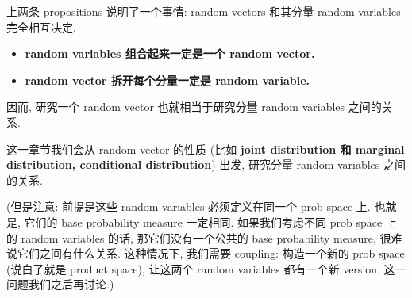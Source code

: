 \begin{remark}
上两条 propositions 说明了一个事情: random vectors 和其分量 random variables 完全相互决定.
\begin{itemize}
    \item\textbf{ random variables 组合起来一定是一个 random vector.}
    \item \textbf{random vector 拆开每个分量一定是 random variable.}
\end{itemize}
因而, 研究一个 random vector 也就相当于研究分量 random variables 之间的关系. 

这一章节我们会从 random vector 的性质 
(比如 \textbf{joint distribution 和 marginal distribution, conditional distribution}) 
出发, 研究分量 random variables 之间的关系.

(但是注意: 前提是这些 random variables 必须定义在同一个 prob space 上. 也就是, 它们的 base 
probability measure 一定相同. 如果我们考虑不同 prob space 上的 random variables 的话, 
那它们没有一个公共的 base probability measure, 很难说它们之间有什么关系. 
这种情况下, 我们需要 coupling: 构造一个新的 prob space (说白了就是 product space),
让这两个 random variables 都有一个新 version. 这一问题我们之后再讨论.)
\end{remark}

